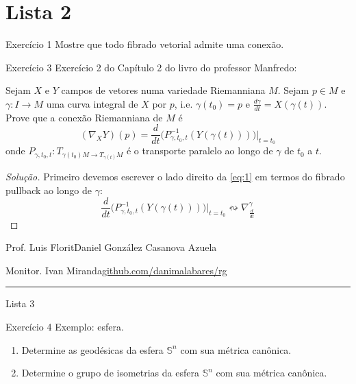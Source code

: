\section{Lista 2}

\begin{thing4}{Exercício 1}\label{exer:1}\leavevmode
Mostre que todo fibrado vetorial admite uma conexão.
\end{thing4}

\begin{thing4}{Exercício 3}\label{exer:3}\leavevmode
Exercício 2 do Capítulo 2 do livro do professor Manfredo:

Sejam \(X\) e \(Y\) campos de vetores numa variedade Riemanniana \(M\). Sejam \(p \in M\) e \(\gamma: I \to M\) uma curva integral de \(X\) por \(p\), i.e. \(\gamma(t_0)=p\) e \(\frac{d\gamma}{dt}=X(\gamma(t))\). Prove que a conexão Riemanniana de  \(M\) é
\begin{equation}\label{eq:1}(\nabla_XY)(p)= \frac{d}{dt}\Big(P^{-1}_{\gamma,t_0,t}(Y(\gamma(t)))\Big)\Big|_{t=t_0}\end{equation}
onde \(P_{\gamma,t_0,t}:T_{\gamma(t_0)M\to T_{\gamma(t)}M}\) é o transporte paralelo ao longo de \(\gamma\) de \(t_0\) a \(t\).
\end{thing4}

\begin{proof}[Solução]\leavevmode
Primeiro devemos escrever o lado direito da  \cref{eq:1} em termos do fibrado pullback ao longo de \(\gamma\):
\[\frac{d}{dt}\Big(P^{-1}_{\gamma,t_0,t}(Y(\gamma(t)))\Big)\Big|_{t=t_0} \leftrightsquigarrow \nabla^\gamma_{\frac{d}{dt}}\]

\end{proof}


\clearpage
\begin{minipage}{\textwidth}
	\begin{minipage}{1\textwidth}
		{\small Prof. Luis Florit\hfill Daniel González Casanova Azuela}
		
		{\small Monitor. Ivan Miranda\hfill\href{https://github.com/danimalabares/rg}{github.com/danimalabares/rg}}
	\end{minipage}
\end{minipage}\vspace{.2cm}\hrule

\vspace{10pt}
{\huge Lista 3}

\begin{thing4}{Exercício 4}\label{exer:4}\leavevmode
Exemplo: esfera.
\begin{enumerate}[label=(\alph*)]
\item Determine as geodésicas da esfera \(\mathbb{S}^n\) com sua métrica canônica.
\item Determine o grupo de isometrias da esfera \(\mathbb{S}^n\) com sua métrica canônica.
\end{enumerate}
\end{thing4}

